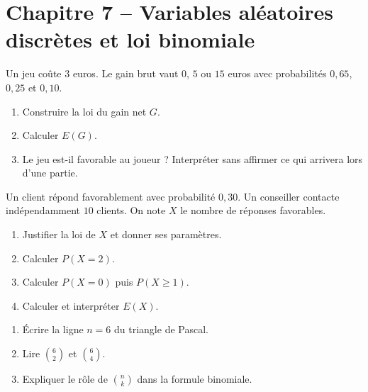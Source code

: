 \section*{Chapitre 7 -- Variables aléatoires discrètes et loi binomiale}
\begin{exercice}
Un jeu coûte $3$ euros. Le gain brut vaut $0$, $5$ ou $15$ euros avec probabilités $0{,}65$, $0{,}25$ et $0{,}10$.
\begin{enumerate}
\item Construire la loi du gain net $G$.
\item Calculer $E(G)$.
\item Le jeu est-il favorable au joueur ? Interpréter sans affirmer ce qui arrivera lors d'une partie.
\end{enumerate}
\end{exercice}
\begin{exercice}
Un client répond favorablement avec probabilité $0{,}30$. Un conseiller contacte indépendamment $10$ clients. On note $X$ le nombre de réponses favorables.
\begin{enumerate}
\item Justifier la loi de $X$ et donner ses paramètres.
\item Calculer $P(X=2)$.
\item Calculer $P(X=0)$ puis $P(X\geq1)$.
\item Calculer et interpréter $E(X)$.
\end{enumerate}
\end{exercice}
\begin{exercice}
\begin{enumerate}
\item Écrire la ligne $n=6$ du triangle de Pascal.
\item Lire $\binom62$ et $\binom64$.
\item Expliquer le rôle de $\binom nk$ dans la formule binomiale.
\end{enumerate}
\end{exercice}

